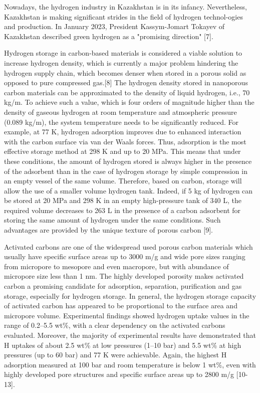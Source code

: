 Nowadays, the hydrogen industry in Kazakhstan is in its infancy.
Nevertheless, Kazakhstan is making significant strides in the field of
hydrogen technol-ogies and production. In January 2023, President
Kassym-Jomart Tokayev of Kazakhstan described green hydrogen as a
"promising direction" {[}7{]}.

Hydrogen storage in carbon-based materials is considered a viable
solution to increase hydrogen density, which is currently a major
problem hindering the hydrogen supply chain, which becomes denser when
stored in a porous solid as opposed to pure compressed gas.{[}8{]} The
hydrogen density stored in nanoporous carbon materials can be
approximated to the density of liquid hydrogen, i.e., 70
kg/m. To achieve such a value, which is four orders
of magnitude higher than the density of gaseous hydrogen at room
temperature and atmospheric pressure (0.089 kg/m),
the system temperature needs to be significantly reduced. For example,
at 77 K, hydrogen adsorption improves due to enhanced interaction with
the carbon surface via van der Waals forces. Thus, adsorption is the
most effective storage method at 298 K and up to 20 MPa. This means that
under these conditions, the amount of hydrogen stored is always higher
in the presence of the adsorbent than in the case of hydrogen storage by
simple compression in an empty vessel of the same volume. Therefore,
based on carbon, storage will allow the use of a smaller volume hydrogen
tank. Indeed, if 5 kg of hydrogen can be stored at 20 MPa and 298 K in
an empty high-pressure tank of 340 L, the required volume decreases to
263 L in the presence of a carbon adsorbent for storing the same amount
of hydrogen under the same conditions. Such advantages are provided by
the unique texture of porous carbon {[}9{]}.

Activated carbons are one of the widespread used porous carbon materials
which usually have specific surface areas up to 3000
m/g and wide pore sizes ranging
from micropore to mesopore and even macropore, but with abundance of
micropore size less than 1 nm. The highly developed porosity makes
activated carbon a promising candidate for adsorption, separation,
purification and gas storage, especially for hydrogen storage. In
general, the hydrogen storage capacity of activated carbon has appeared
to be proportional to the surface area and micropore volume.
Experimental findings showed hydrogen uptake values in the range of
0.2--5.5 wt\%, with a clear dependency on the activated carbons
evaluated. Moreover, the majority of experimental results have
demonstrated that H uptakes of about 2.5 wt\% at low
pressures (1--10 bar) and 5.5 wt\% at high pressures (up to 60 bar) and
77 K were achievable. Again, the highest H adsorption
measured at 100 bar and room temperature is below 1 wt\%, even with
highly developed pore structures and specific surface areas up to 2800
m/g {[}10-13{]}.

